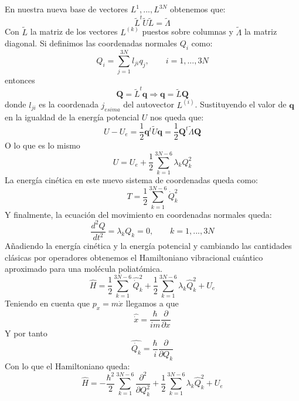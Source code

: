 \documentclass[a4paper]{article}
\begin{document}
En nuestra nueva base de vectores $L^{1},...,L^{3N}$ obtenemos que:
\begin{equation}
\tilde L^t\tilde U\tilde L = \tilde \Lambda
\end{equation}
Con $\tilde L$ la matriz de los vectores $L^{(k)}$ puestos sobre columnas y $\tilde \Lambda$ la matriz diagonal. Si definimos las coordenadas normales $Q_i$ como:
\begin{equation}
Q_i=\sum_{j=1}^{3N}l_{ji}q_j, \qquad i=1,...,3N
\end{equation}
entonces
\begin{equation}
\boldsymbol Q = \tilde L^t\boldsymbol q \Rightarrow \boldsymbol q = \tilde L\boldsymbol Q
\end{equation}
donde $l_{ji}$ es la coordenada $j_{esima}$ del autovector $L^{(i)}$. Sustituyendo el valor de $\boldsymbol q$ en la igualdad de la energía potencial $U$ nos queda que:
\begin{equation}
U-U_e=\frac{1}{2}\boldsymbol q^t\tilde U \boldsymbol q = \frac{1}{2}\boldsymbol Q^t\tilde \Lambda \boldsymbol Q
\end{equation}
O lo que es lo mismo
\begin{equation}
U=U_e + \frac{1}{2}\sum_{k=1}^{3N-6}\lambda_kQ_k^2
\end{equation}
La energía cinética en este nuevo sistema de coordenadas queda como:
\begin{equation}
T=\frac{1}{2}\sum_{k=1}^{3N-6}\dot Q_k^2
\end{equation}
Y finalmente, la ecuación del movimiento en coordenadas normales queda:
\begin{equation}
\frac{d^2Q}{dt^2}=\lambda_kQ_k=0, \qquad k=1,...,3N
\end{equation}
Añadiendo la energía cinética y la energía potencial y cambiando las cantidades clásicas por operadores obtenemos el Hamiltoniano vibracional cuántico aproximado para una molécula poliatómica.
\begin{equation}
\hat H= \frac{1}{2}\sum_{k=1}^{3N-6} \hat{\dot Q}_k^2 + \frac{1}{2} \sum_{k=1}^{3N-6} \lambda_k \hat Q_k^2 + U_e
\end{equation}
Teniendo en cuenta que $p_x=m\dot x$ llegamos a que
$$\hat{\dot{x}}=\frac{\hbar}{im}\frac{\partial}{\partial x}$$
Y por tanto
\begin{equation}
\hat{\dot{Q_k}}=\frac{\hbar}{i}\frac{\partial}{\partial Q_k}
\end{equation}
Con lo que el Hamiltoniano queda:
\begin{equation}
\hat H= -\frac{\hbar^2}{2}\sum_{k=1}^{3N-6} \frac{\partial^2}{\partial Q^2_k} + \frac{1}{2} \sum_{k=1}^{3N-6} \lambda_k \hat Q_k^2 + U_e
\end{equation}
\end{document}
